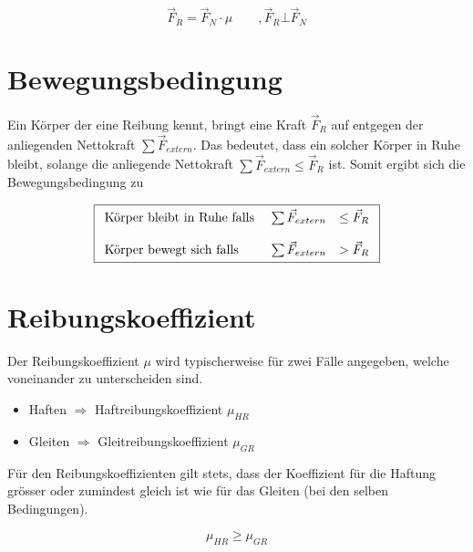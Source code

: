 \[ \boxed{
	\vec{F}_R = \vec{F}_N \cdot \mu
		\qquad ,\vec{F}_R \bot \vec{F}_N
}\]

\section{Bewegungsbedingung}
\noindent
Ein Körper der eine Reibung kennt, bringt eine Kraft $\vec{F}_R$ 
auf entgegen der anliegenden Nettokraft $\sum \vec{F}_{extern}$. 
Das bedeutet, dass ein solcher Körper in Ruhe bleibt, solange die 
anliegende Nettokraft $\sum \vec{F}_{extern} \leq \vec{F}_R$ ist. 
Somit ergibt sich die Bewegungsbedingung zu

\[ \boxed{\begin{array}{l r l}
	\text{Körper bleibt in Ruhe falls } & 
		\sum \vec{F}_{extern} & \leq \vec{F}_R \\
	& & \\
	\text{Körper bewegt sich falls } &
		\sum \vec{F}_{extern} & > \vec{F}_R 
\end{array}} \]

\section{Reibungskoeffizient}
Der Reibungskoeffizient $\mu$ wird typischerweise für zwei Fälle 
angegeben, welche voneinander zu unterscheiden sind.
\begin{itemize}
	\item Haften $\Rightarrow$ Haftreibungskoeffizient $\mu_{HR}$
	\item Gleiten $\Rightarrow$ Gleitreibungskoeffizient $\mu_{GR}$
\end{itemize}

\noindent
Für den Reibungskoeffizienten gilt stets, dass der Koeffizient für die
Haftung grösser oder zumindest gleich ist wie für das Gleiten 
(bei den selben Bedingungen).

\[ \boxed{
	\mu_{HR} \geq \mu_{GR}
}\]

